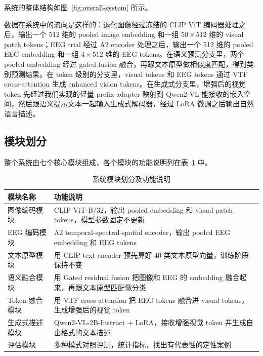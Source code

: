 系统的整体结构如图~\ref{fig:overall-system} 所示。


数据在系统中的流向是这样的：退化图像经过冻结的 CLIP ViT 编码器处理之后，输出一个 512 维的 pooled image embedding 和一组 $50\times512$ 维的 visual patch tokens；EEG trial 经过 A2 encoder 处理之后，输出一个 512 维的 pooled EEG embedding 和一组 $4\times512$ 维的 EEG tokens。在语义预测分支里，两个 pooled embedding 经过 gated fusion 融合，再跟文本原型做相似度匹配，得到类别预测结果。在 token 级别的分支里，visual tokens 和 EEG tokens 通过 VTF cross-attention 生成 enhanced vision tokens。在生成式分支里，增强后的视觉 token 先经过我们实现的轻量 prefix adapter 映射到 Qwen2-VL 能接收的嵌入空间，然后跟语义提示文本一起输入生成式解码器，经过 LoRA 微调之后输出自然语言描述。

\subsection{模块划分}

整个系统由七个核心模块组成，各个模块的功能说明列在表~\ref{tab:modules} 中。

\begin{table}[htbp]
  \centering
  \caption{系统模块划分及功能说明}
  \label{tab:modules}
  \begin{tabularx}{\linewidth}{l X}
    \toprule
    模块名称 & 功能说明 \\
    \midrule
    图像编码模块 & CLIP ViT-B/32，输出 pooled embedding 和 visual patch tokens，模型参数固定不更新 \\
    EEG 编码模块 & A2 temporal-spectral-spatial encoder，输出 pooled EEG embedding 和 EEG tokens \\
    文本原型模块 & 用 CLIP text encoder 预先算好 40 类文本原型向量，训练阶段保持不变 \\
    语义融合模块 & 用 Gated residual fusion 把图像和 EEG 的 embedding 融合起来，再跟文本原型匹配做分类 \\
    Token 融合模块 & 用 VTF cross-attention 把 EEG tokens 融合进 visual tokens，生成增强后的视觉 token \\
    生成式描述模块 & Qwen2-VL-2B-Instruct + LoRA，接收增强视觉 token 并生成自由格式的文本描述 \\
    评估模块 & 多种模式对照评测，统计指标，找出有代表性的定性案例 \\
    \bottomrule
  \end{tabularx}
\end{table}

